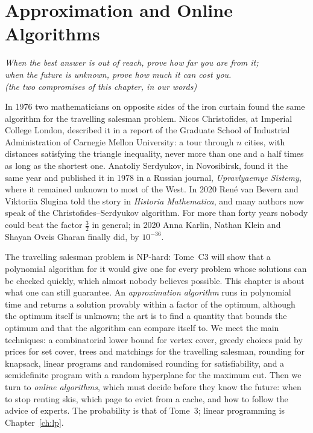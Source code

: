 \chapter{Approximation and Online Algorithms}\label{ch:approx}

\begin{center}\itshape
When the best answer is out of reach, prove how far you are from it;\\
when the future is unknown, prove how much it can cost you.\\
\upshape(the two compromises of this chapter, in our words)
\end{center}

In 1976 two mathematicians on opposite sides of the iron curtain found the same algorithm for the travelling salesman problem. Nicos Christofides, at Imperial College London, described it in a report of the Graduate School of Industrial Administration of Carnegie Mellon University: a tour through $n$ cities, with distances satisfying the triangle inequality, never more than one and a half times as long as the shortest one.
Anatoliy Serdyukov, in Novosibirsk, found it the same year and published it in 1978 in a Russian journal, \emph{Upravlyaemye Sistemy}, where it remained unknown to most of the West. In 2020 René van Bevern and Viktoriia Slugina told the story in \emph{Historia Mathematica}, and many authors now speak of the Christofides--Serdyukov algorithm. For more than forty years nobody could beat the factor $\frac32$ in general; in 2020 Anna Karlin, Nathan Klein and Shayan Oveis Gharan finally did, by $10^{-36}$.

The travelling salesman problem is NP-hard: Tome~C3 will show that a polynomial algorithm for it would give one for every problem whose solutions can be checked quickly, which almost nobody believes possible. This chapter is about what one can still guarantee. An \emph{approximation algorithm} runs in polynomial time and returns a solution provably within a factor of the optimum, although the optimum itself is unknown; the art is to find a quantity that bounds the optimum and that the algorithm can compare itself to. We meet the main techniques: a combinatorial lower bound for vertex cover,
greedy choices paid by prices for set cover, trees and matchings for the travelling salesman, rounding for knapsack, linear programs and randomised rounding for satisfiability, and a semidefinite program with a random hyperplane for the maximum cut. Then we turn to \emph{online algorithms}, which must decide before they know the future: when to stop renting skis, which page to evict from a cache, and how to follow the advice of experts. The probability is that of Tome~3; linear programming is Chapter~\ref{ch:lp}.

